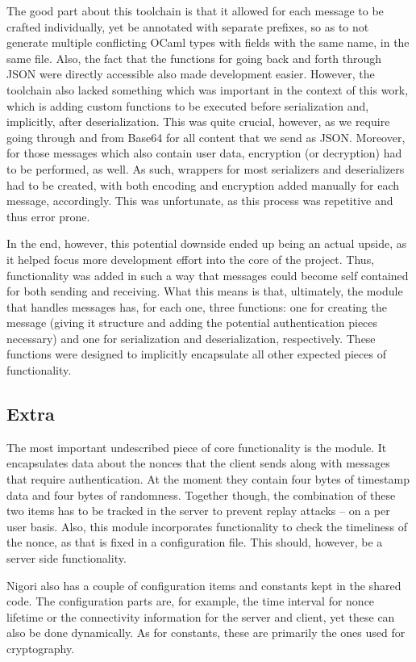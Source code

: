 The good part about this toolchain is that it allowed for each message to be crafted individually, yet be annotated with separate prefixes, so as to not generate multiple conflicting OCaml types with fields with the same name, in the same file.
Also, the fact that the functions for going back and forth through JSON were directly accessible also made development easier.
However, the toolchain also lacked something which was important in the context of this work, which is adding custom functions to be executed before serialization and, implicitly, after deserialization.
This was quite crucial, however, as we require going through and from Base64 for all content that we send as JSON.
Moreover, for those messages which also contain user data, encryption (or decryption) had to be performed, as well.
As such, wrappers for most serializers and deserializers had to be created, with both encoding and encryption added manually for each message, accordingly.
This was unfortunate, as this process was repetitive and thus error prone.

In the end, however, this potential downside ended up being an actual upside, as it helped focus more development effort into the core of the project.
Thus, functionality was added in such a way that messages could become self contained for both sending and receiving.
What this means is that, ultimately, the module that handles messages has, for each one, three functions: one for creating the message (giving it structure and adding the potential authentication pieces necessary) and one for serialization and deserialization, respectively.
These functions were designed to implicitly encapsulate all other expected pieces of functionality.

\subsection{Extra}
The most important undescribed piece of core functionality is the  module.
It encapsulates data about the nonces that the client sends along with messages that require authentication.
At the moment they contain four bytes of timestamp data and four bytes of randomness.
Together though, the combination of these two items has to be tracked in the server to prevent replay attacks -- on a per user basis.
Also, this module incorporates functionality to check the timeliness of the nonce, as that is fixed in a configuration file.
This should, however, be a server side functionality.

Nigori also has a couple of configuration items and constants kept in the shared code.
The configuration parts are, for example, the time interval for nonce lifetime or the connectivity information for the server and client, yet these can also be done dynamically.
As for constants, these are primarily the ones used for cryptography.


